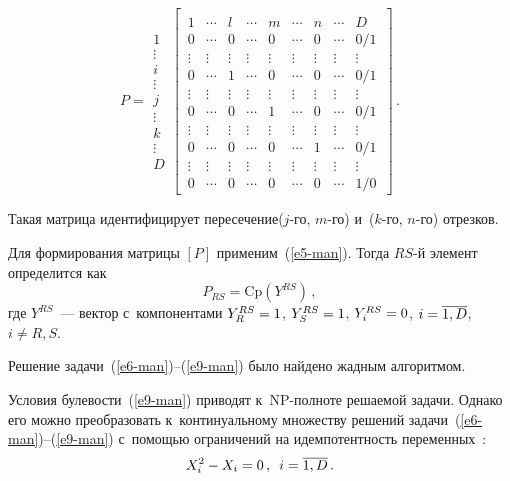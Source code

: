 \begin{multicols}{2}
\vspace*{18pt}

\noindent
  $$
  P=\begin{matrix}
  1\\ \vdots \\ i\\ \vdots\\ j\\ \vdots \\ k \\\vdots \\ D
  \end{matrix}
  \left[\,
  \begin{matrix}
    \\[-24pt]
  1 & \cdots & l&\cdots &  m& \cdots & n&\cdots& D\\
  0&\cdots& 0& \cdots & 0 &\cdots & 0 &\cdots & 0/1\\
  \vdots &\vdots&\vdots&\vdots&\vdots&\vdots&\vdots&\vdots&\vdots\\
  0&\cdots&1 & \cdots & 0&\cdots& 0&\cdots& 0/1\\
  \vdots &\vdots&\vdots&\vdots&\vdots&\vdots&\vdots&\vdots&\vdots\\
  0&\cdots&0 & \cdots & 1&\cdots& 0&\cdots& 0/1\\
  \vdots &\vdots&\vdots&\vdots&\vdots&\vdots&\vdots&\vdots&\vdots\\
  0&\cdots&0 & \cdots & 0&\cdots& 1&\cdots& 0/1\\
  \vdots &\vdots&\vdots&\vdots&\vdots&\vdots&\vdots&\vdots&\vdots\\
  0&\cdots&0 & \cdots & 0&\cdots& 0&\cdots& 1/0
  \end{matrix}
  \,\right]\,.
  $$
  
  
  
  Такая матрица идентифицирует пересечение\linebreak ($j$-го, $m$-го) и~($k$-го,  
$n$-го) отрезков.
  
  Для формирования мат\-ри\-цы $[{P}]$ применим~(\ref{e5-man}). Тогда 
$RS$-й элемент определится как
  $$ 
  P_{RS}=\mathrm{Cp}\left( Y^{RS}\right)\,,
  $$
где $Y^{RS}$~--- вектор с~компонентами $Y_R^{RS}\hm= 1$, $Y_S^{RS}\hm= 
1$, $Y_i^{RS}\hm= 0$, $i\hm=\overline{1,D}$, $i\not= R, S$.
  
  Решение задачи~(\ref{e6-man})--(\ref{e9-man}) было найдено жад\-ным 
алгоритмом.
  
  Условия булевости~(\ref{e9-man}) приводят к~NP-пол\-но\-те ре\-ша\-емой 
задачи. Однако его мож\-но преобразовать к~континуальному множеству 
решений задачи~(\ref{e6-man})--(\ref{e9-man}) с~по\-мощью ограничений на 
идемпотентность переменных~\cite{12-man}:
  \begin{equation}
  X_i^2-X_i=0\,,\enskip i=\overline{1,D}\,.
  \label{e10-man}
  \end{equation}
  

\end{multicols}
